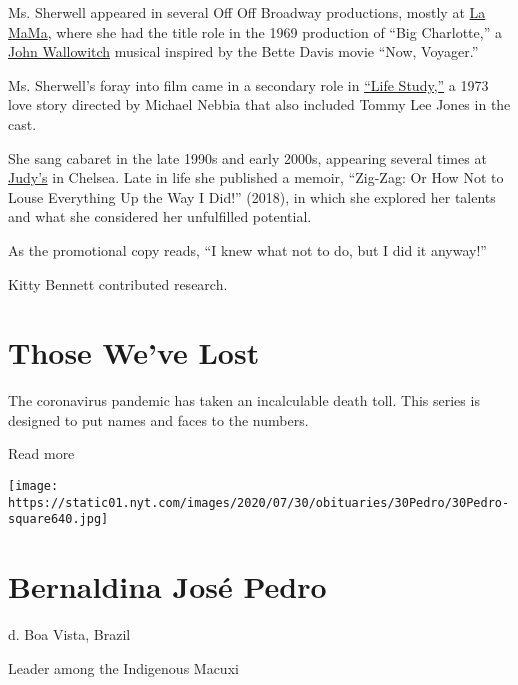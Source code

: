 Ms. Sherwell appeared in several Off Off Broadway productions, mostly at
\href{http://lamama.org/}{La MaMa}, where she had the title role in the
1969 production of ``Big Charlotte,'' a
\href{https://www.nytimes.com/2007/08/16/arts/music/16wallowitch.html}{John
Wallowitch} musical inspired by the Bette Davis movie ``Now, Voyager.''

Ms. Sherwell's foray into film came in a secondary role in
\href{https://www.nytimes.com/1973/01/26/archives/life-studyscreen-love-story-is-all-too-vulnerable.html}{``Life
Study,''} a 1973 love story directed by Michael Nebbia that also
included Tommy Lee Jones in the cast.

She sang cabaret in the late 1990s and early 2000s, appearing several
times at
\href{https://www.nytimes.com/2009/12/31/arts/music/31kreston.html}{Judy's}
in Chelsea. Late in life she published a memoir, ``Zig-Zag: Or How Not
to Louse Everything Up the Way I Did!'' (2018), in which she explored
her talents and what she considered her unfulfilled potential.

As the promotional copy reads, ``I knew what not to do, but I did it
anyway!''

Kitty Bennett contributed research.

\href{https://www.nytimes.com/interactive/2020/obituaries/people-died-coronavirus-obituaries.html?action=click\&pgtype=Article\&state=default\&region=BELOW_MAIN_CONTENT\&context=covid_obits_promo}{}

\hypertarget{those-weve-lost}{%
\section{Those We've Lost}\label{those-weve-lost}}

The coronavirus pandemic has taken an incalculable death toll. This
series is designed to put names and faces to the numbers.

Read more

\texttt{[image: https://static01.nyt.com/images/2020/07/30/obituaries/30Pedro/30Pedro-square640.jpg]}

\hypertarget{bernaldina-josuxe9-pedro}{%
\section{Bernaldina José Pedro}\label{bernaldina-josuxe9-pedro}}

d. Boa Vista, Brazil

Leader among the Indigenous Macuxi

